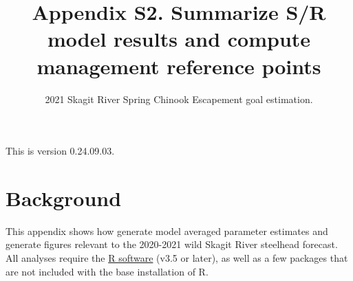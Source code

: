 \documentclass[
  11pt,
]{article}
\title{Appendix S2. Summarize S/R model results and compute management
reference points}
\subtitle{2021 Skagit River Spring Chinook Escapement goal estimation.}
\author{}
\date{\vspace{-2.5em}}
\begin{document}
\maketitle

{
\setcounter{tocdepth}{3}
\tableofcontents
}
\vspace{0.2in}

This is version 0.24.09.03.

\hypertarget{background}{%
\section{Background}\label{background}}

This appendix shows how generate model averaged parameter estimates and
generate figures relevant to the 2020-2021 wild Skagit River steelhead
forecast. All analyses require the \href{https://cran.r-project.org/}{R
software} (v3.5 or later), as well as a few packages that are not
included with the base installation of R.
\end{document}
